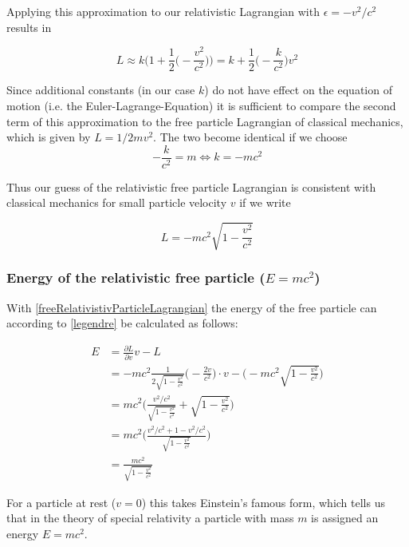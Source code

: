 \documentclass{article}
\begin{document}
Applying this approximation to our relativistic Lagrangian with $\epsilon = - v^2/c^2$ results in

\begin{equation}
    L \approx k \bigg(1 + \frac{1}{2} \bigg(-\frac{v^2}{c^2} \bigg) \bigg)
    = k + \frac{1}{2} \bigg(-\frac{k}{c^2} \bigg) v^2
\end{equation}

Since additional constants (in our case $k$) do not have effect on the equation of motion (i.e. the Euler-Lagrange-Equation) it is sufficient to compare the second term of this approximation to the free particle Lagrangian of classical mechanics, which is given by $L=1/2 m v^2$.
The two become identical if we choose
\begin{equation}
    - \frac{k}{c^2} = m \iff k = -mc^2
\end{equation}

Thus our guess of the relativistic free particle Lagrangian is consistent with classical mechanics for small particle velocity $v$ if we write

\begin{equation} \label{freeRelativistivParticleLagrangian}
L = -mc^2 \sqrt{1-\frac{v^2}{c^2}}
\end{equation}


\subsubsection{Energy of the relativistic free particle ($E=mc^2$)}

With \ref{freeRelativistivParticleLagrangian} the energy of the free particle can according to \ref{legendre} be calculated as follows:

\begin{align}
    E &= \frac{\partial L}{\partial v} v - L \\
    &= -m c^2 \frac{1}{2 \sqrt{1-\frac{v^2}{c^2}}} \bigg(-\frac{2v}{c^2} \bigg) \cdot v
    -\bigg(-mc^2 \sqrt{1-\frac{v^2}{c^2}} \bigg) \\
    &= m c^2 \bigg(\frac{v^2/c^2}{\sqrt{1-\frac{v^2}{c^2}}} + \sqrt{1-\frac{v^2}{c^2}} \bigg) \\
    &= m c^2 \bigg(\frac{v^2/c^2 + 1 - v^2/c^2}{\sqrt{1-\frac{v^2}{c^2}}} \bigg) \\
    &= \frac{m c^2}{\sqrt{1-\frac{v^2}{c^2}}}
\end{align}

For a particle at rest ($v=0$) this takes Einstein's famous form, which tells us that in the theory of special relativity a particle with mass $m$ is assigned an energy $E = m c^2$.
\end{document}
